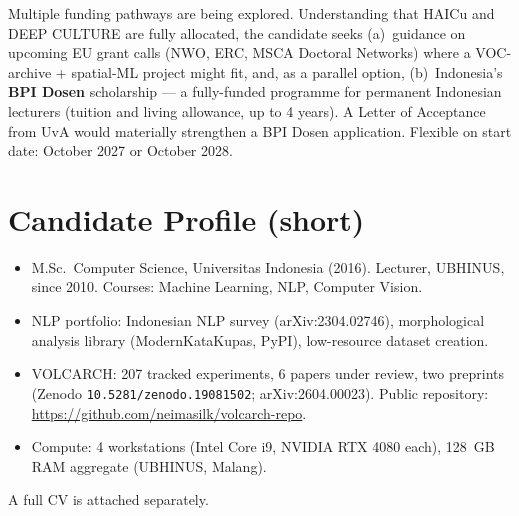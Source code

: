 \documentclass[11pt,a4paper]{article}
\begin{document}
Multiple funding pathways are being explored. Understanding that HAICu and DEEP CULTURE are fully allocated, the candidate seeks (a)~guidance on upcoming EU grant calls (NWO, ERC, MSCA Doctoral Networks) where a VOC-archive + spatial-ML project might fit, and, as a parallel option, (b)~Indonesia's \textbf{BPI Dosen} scholarship --- a fully-funded programme for permanent Indonesian lecturers (tuition and living allowance, up to 4 years). A Letter of Acceptance from UvA would materially strengthen a BPI Dosen application. Flexible on start date: October 2027 or October 2028.

\section{Candidate Profile (short)}

\begin{itemize}[nosep]
  \item M.Sc.\ Computer Science, Universitas Indonesia (2016). Lecturer, UBHINUS, since 2010. Courses: Machine Learning, NLP, Computer Vision.
  \item NLP portfolio: Indonesian NLP survey (arXiv:2304.02746), morphological analysis library (ModernKataKupas, PyPI), low-resource dataset creation.
  \item VOLCARCH: 207 tracked experiments, 6 papers under review, two preprints (Zenodo \texttt{10.5281/zenodo.19081502}; arXiv:2604.00023). Public repository: \url{https://github.com/neimasilk/volcarch-repo}.
  \item Compute: 4 workstations (Intel Core i9, NVIDIA RTX 4080 each), 128~GB RAM aggregate (UBHINUS, Malang).
\end{itemize}

A full CV is attached separately.
\end{document}
